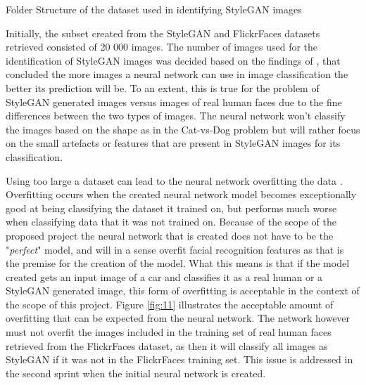\begin{table}[H]%
\caption{Folder Structure of the dataset used in identifying StyleGAN images}
\label{tabl:folders}
\center
\small
{}
\end{table}

Initially, the subset created from the StyleGAN and FlickrFaces datasets retrieved consisted of 20 000 images. The number of images used for the identification of StyleGAN images was decided based on the findings of \cite{Nasr2016}, that concluded the more images a neural network can use in image classification the better its prediction will be. To an extent, this is true for the problem of StyleGAN generated images versus images of real human faces due to the fine differences between the two types of images. The neural network won't classify the images based on the shape as in the Cat-vs-Dog problem but will rather focus on the small artefacts or features that are present in StyleGAN images for its classification. 

Using too large a dataset can lead to the neural network overfitting the data \citep{Trask2019}. Overfitting occurs when the created neural network model becomes exceptionally good at being classifying the dataset it trained on, but performs much worse when classifying data that it was not trained on. Because of the scope of the proposed project the neural network that is created does not have to be the "\textit{perfect}" model, and will in a sense overfit facial recognition features as that is the premise for the creation of the model. What this means is that if the model created gets an input image of a car and classifies it as a real human or a StyleGAN generated image, this form of overfitting is acceptable in the context of the scope of this project. Figure \ref{fig:11} illustrates the acceptable amount of overfitting that can be expected from the neural network. The network however must not overfit the images included in the training set of real human faces retrieved from the FlickrFaces dataset, as then it will classify all images as StyleGAN if it was not in the FlickrFaces training set. This issue is addressed in the second sprint when the initial neural network is created. 
  
